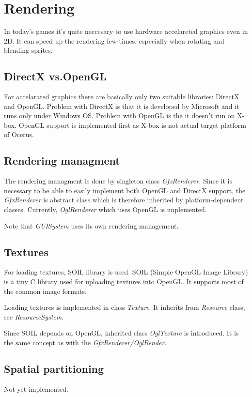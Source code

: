 \section{Rendering}
In today's games it's quite neccesary to use hardware accelareted graphics even in 2D. It can speed up the rendering few-times, especially when rotating and blending sprites.

\subsection{DirectX vs.OpenGL}
For accelarated graphics there are basically only two suitable libraries: DirectX and OpenGL. Problem with DirectX is that it is developed by Microsoft and it runs only under Windows OS. Problem with OpenGL is the it doesn't run on X-box. 
OpenGL support is implemented first as X-box is not actual target platform of Ocerus.

\subsection{Rendering managment}
The rendering managment is done by singleton class \emph{GfxRenderer}. Since it is necessary to be able to easily implement both OpenGL and DirectX support, the \emph{GfxRenderer} is abstract class which is therefore inherited by platform-dependent classes. Currently, \emph{OglRenderer} which uses OpenGL is implemented.

Note that \emph{GUISystem} uses its own rendering management.

\subsection{Textures}
For loading textures, SOIL library is used.
SOIL (Simple OpenGL Image Library) is a tiny C library used for uploading textures into OpenGL. It supports most of the common image formats.

Loading textures is implemented in class \emph{Texture}. It inherits from  \emph{Resource} class, see \emph{ResourceSystem}. 

Since SOIL depends on OpenGL, inherited class \emph{OglTexture} is introduced. It is the same concept as with the \emph{GfxRenderer/OglRender}.
 
\subsection{Spatial partitioning}
Not yet implemented.

